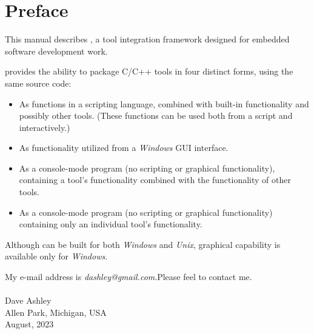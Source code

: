 \chapter{Preface}

This manual describes \emph{\productname{}}, a tool integration
framework designed for embedded software development work.

\emph{\productname{}} provides the ability to package C/C++ tools
in four distinct forms, using the same source code:

\begin{itemize}
      \item As functions in a scripting language, combined 
            with built-in \emph{\productname{}} functionality and
            possibly other tools.  (These functions can be used
            both from a script and interactively.)
      \item As functionality utilized from a \emph{Windows} GUI interface.
      \item As a console-mode program (no scripting or graphical functionality),
            containing a tool's functionality combined with the functionality of
            other tools.
      \item As a console-mode program (no scripting or graphical functionality)
            containing only an individual tool's
            functionality.
\end{itemize}

Although \emph{\productname{}} can be built for both \emph{Windows} and
\emph{Unix}, graphical capability is available only for \emph{Windows}.

My e-mail address is \emph{dashley@gmail.com}.\@ Please feel
to contact me.
\\\\
\noindent\hspace*{2.5in}Dave Ashley\\
\noindent\hspace*{2.5in}Allen Park, Michigan, USA\\
\noindent\hspace*{2.5in}August, 2023
